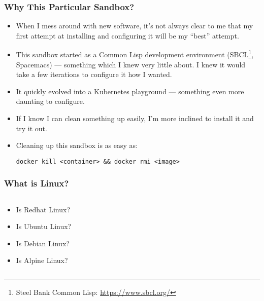     \begin{frame}[fragile]
      \frametitle{Why This Particular Sandbox?}
      \begin{itemize}
      \item<2->When I mess around with new software, it's not always clear to me that
        my first attempt at installing and configuring it will be my ``best'' attempt.
      \item<3->This sandbox started as a Common Lisp development environment
        (SBCL\footnote<3->{Steel Bank Common Lisp: \href{https://www.sbcl.org/}{https://www.sbcl.org/}}, Spacemacs) --- something which I knew very little about. I knew
        it would take a few iterations to configure it how I wanted.
      \item<4->It quickly evolved into a Kubernetes playground --- something
        even more daunting to configure.
      \item<5->If I know I can clean something up easily, I'm more inclined to
        install it and try it out.
      \item<6->Cleaning up this sandbox is as easy as:\\
\begin{verbatim}
docker kill <container> && docker rmi <image>
\end{verbatim}
      \end{itemize}
    \end{frame}

    \begin{frame}
    \frametitle{What is Linux?}
    \begin{columns}
        \begin{column}{0.5\textwidth}
            \begin{itemize}
                \item<2->Is Redhat Linux?
                \item<3->Is Ubuntu Linux?
                \item<4->Is Debian Linux?
                \item<5->Is Alpine Linux?
            \end{itemize}
        \end{column}
        \begin{column}{0.5\textwidth}
          \begin{center}
          \end{center}
        \end{column}
    \end{columns}
    \end{frame}

